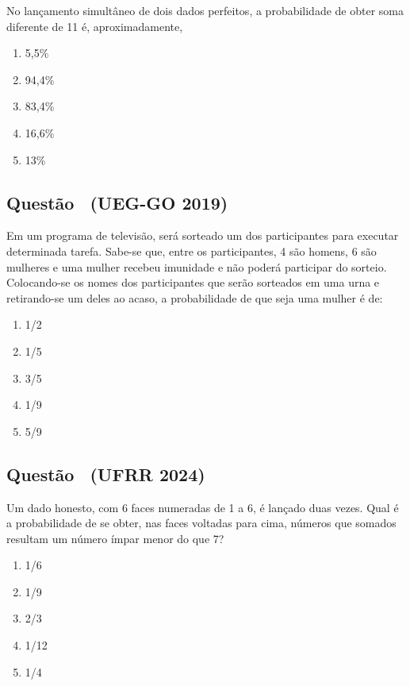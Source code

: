 \documentclass[12pt]{article}
\newcounter{questao}
\newcommand{\novaquestao}[1]{%
  \stepcounter{questao}%
  \subsection*{Questão \thequestao\ (#1)}%
}
\begin{document}
\begin{multicols}{2}
            No lançamento simultâneo de dois dados perfeitos, a probabilidade de obter 
            soma diferente de 11 é, aproximadamente,

            \begin{enumerate}[label=(\alph*), noitemsep]
                \item 5,5\%
                \item 94,4\%  %
                \item 83,4\%
                \item 16,6\%
                \item 13\%
            \end{enumerate}


        
        \novaquestao{UEG-GO 2019}
            
            Em um programa de televisão, será sorteado um dos participantes para executar 
            determinada tarefa. Sabe-se que, entre os participantes, 4 são homens, 6 são 
            mulheres e uma mulher recebeu imunidade e não poderá participar do sorteio. 
            Colocando-se os nomes dos participantes que serão sorteados em uma urna e 
            retirando-se um deles ao acaso, a probabilidade de que seja uma mulher é de:

            \begin{enumerate}[label=(\alph*), noitemsep]
                \item {1}/{2}
                \item {1}/{5}
                \item {3}/{5} 
                \item {1}/{9} 
                \item {5}/{9}
            \end{enumerate}
        
        \novaquestao{UFRR 2024}
            Um dado honesto, com 6 faces numeradas de 1 a 6, é lançado duas vezes. 
            Qual é a probabilidade de se obter, nas faces voltadas para cima, números 
            que somados resultam um número ímpar menor do que 7?

            \begin{enumerate}[label=(\alph*), noitemsep]
                \item {1}/{6}
                \item {1}/{9}
                \item {2}/{3} 
                \item {1}/{12} 
                \item {1}/{4}
            \end{enumerate}
        

\end{multicols}
\end{document}
